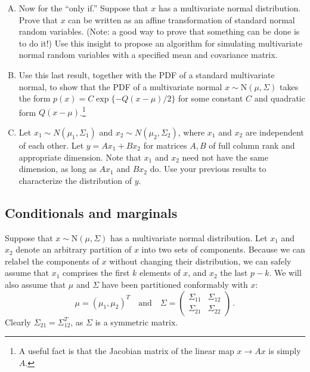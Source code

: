 \documentclass{mynotes}
\newcommand{\N}{\mbox{N}}
\begin{document}
\begin{enumerate}[(A)]
\item Now for the ``only if.''  Suppose that $x$ has a multivariate normal distribution.  Prove that $x$ can be written as an affine transformation of standard normal random variables.  (Note: a good way to prove that something can be done is to do it!)  Use this insight to propose an algorithm for simulating multivariate normal random variables with a specified mean and covariance matrix.

\item Use this last result, together with the PDF of a standard multivariate normal, to show that the PDF of a multivariate normal $x \sim \N(\mu, \Sigma)$ takes the form $p(x) = C \exp\{-Q(x-\mu)/2\}$ for some constant $C$ and quadratic form $Q(x-\mu)$.\footnote{A useful fact is that the Jacobian matrix of the linear map $x \rightarrow Ax$ is simply $A$.}


\item Let $x_1 \sim N(\mu_1, \Sigma_1)$ and $x_2 \sim N(\mu_2, \Sigma_2)$, where $x_1$ and $x_2$ are independent of each other.  Let $y = A x_1 + B x_2$ for matrices $A,B$ of full column rank and appropriate dimension.  Note that $x_1$ and $x_2$ need not have the same dimension, as long as $A x_1$ and $B x_2$ do.  Use your previous results to characterize the distribution of $y$.

\end{enumerate}

\subsection{Conditionals and marginals}

Suppose that $x \sim \N(\mu, \Sigma)$ has a multivariate normal distribution.  Let $x_1$ and $x_2$ denote an arbitrary partition of $x$ into two sets of components.  Because we can relabel the components of $x$ without changing their distribution, we can safely assume that $x_1$ comprises the first $k$ elements of $x$, and $x_2$ the last $p-k$.  We will also assume that $\mu$ and $\Sigma$ have been partitioned conformably with $x$:
$$
\mu = (\mu_1, \mu_2)^T \quad \mbox{and} \quad \Sigma =
\left(
\begin{array}{cc}
\Sigma_{11} & \Sigma_{12} \\
\Sigma_{21} & \Sigma_{22} 
\end{array}
\right) \, .
$$
Clearly $\Sigma_{21} = \Sigma_{12}^T$, as $\Sigma$ is a symmetric matrix.
\end{document}
